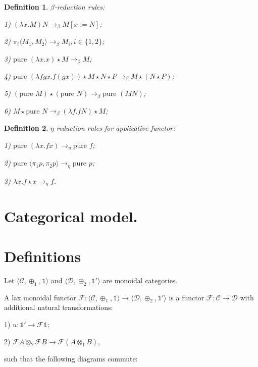 \documentclass[a4paper]{article}
\newtheorem{defin}{Definition}
\begin{document}
\begin{defin} $\beta$-reduction rules:

1) $(\lambda x. M) N \rightarrow_{\beta} M [x := N]$;

2) $\pi_i \langle M_1, M_2 \rangle \rightarrow_{\beta} M_i, i \in \{ 1,2 \}$;

3) $\text{pure } (\lambda x. x) \star M \rightarrow_{\beta} M$;

4) $\text{pure } (\lambda f g x. f (g x)) \star M \star N \star P \rightarrow_{\beta} M \star (N \star P)$;

5) $(\text{pure } M) \star (\text{pure } N) \rightarrow_{\beta} \text{pure } (M N)$;

6) $M \star \text{pure } N \rightarrow_{\beta} (\lambda f. f N) \star M$;
\end{defin}

\begin{defin} $\eta$-reduction rules for applicative functor:

1) $\text{pure } (\lambda x. f x) \rightarrow_{\eta} \text{pure } f$;

2) $\text{pure } \langle \pi_1 p, \pi_2 p \rangle \rightarrow_{\eta} \text{pure } p$;

3) $\lambda x. f \star x \rightarrow_{\eta} f$.
\end{defin}


\section{Categorical model.}

\section{Definitions}

Let $\langle \mathcal{C}, \oplus_1, \mathds{1} \rangle$ and $\langle \mathcal{D}, \oplus_2, \mathds{1}' \rangle$ are monoidal categories.

A lax monoidal functor $\mathcal{F} : \langle \mathcal{C}, \oplus_1, \mathds{1} \rangle \to \langle \mathcal{D}, \oplus_2, \mathds{1}' \rangle$ is a functor
$\mathcal{F} : \mathcal{C} \to \mathcal{D}$ with additional natural transformations:

1) $u : \mathds{1}' \to \mathcal{F}\mathds{1}$;

2) $\mathcal{F}A \otimes_2 \mathcal{F}B \to \mathcal{F}(A \otimes_1 B)$,

such that the following diagrams commute:
\end{document}
